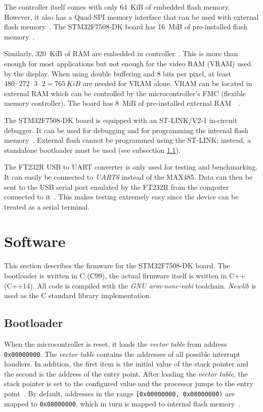 The controller itself comes with only \SI{64}{KiB} of embedded flash memory. However, it also has a
Quad-SPI memory interface that can be used with external flash memory~\cite{mcu-datasheet}. The
STM32F7508-DK board has \SI{16}{MiB} of pre-installed flash memory~\cite{board-user-manual}.

Similarly, \SI{320}{KiB} of RAM are embedded in controller~\cite{mcu-datasheet}. This is more than
enough for most applications but not enough for the video RAM (VRAM) used by the display. When using
double buffering and 8 bits per pixel, at least $480 \cdot 272 \cdot 3 \cdot 2 = 765\,\si{KiB}$ are
needed for VRAM alone. VRAM can be located in external RAM which can be controlled by the microcontroller's
FMC (flexible memory controller). The board has \SI{8}{MiB} of pre-installed external RAM~\
\cite{mcu-datasheet}\cite{board-user-manual}.

The STM32F7508-DK board is equipped with an ST-LINK/V2-1 in-circuit debugger. It can be used for
debugging and for programming the internal flash memory~\cite{board-user-manual}. External flash
cannot be programmed using the ST-LINK; instead, a standalone bootloader must be used (see subsection
\ref{implementation/software/bootloader}).

The FT232R USB to UART converter is only used for testing and benchmarking. It can easily be connected
to \textit{UART6} instead of the MAX485. Data can then be sent to the USB serial port emulated by
the FT232R from the computer connected to it~\cite{ftdi-232r-datasheet}. This makes testing extremely
easy since the device can be treated as a serial terminal.

\section{Software}
\label{implementation/software}

This section describes the firmware for the STM32F7508-DK board. The bootloader is written in C
(C99), the actual firmware itself is written in C++ (C++14). All code is compiled with the
\textit{GNU arm-none-eabi} toolchain. \textit{Newlib} is used as the C standard library implementation.

\subsection{Bootloader}
\label{implementation/software/bootloader}

When the microcontroller is reset, it loads the \textit{vector table} from address \mbox{\lstinline{0x00000000}.}
The \textit{vector table} contains the addresses of all possible interrupt handlers. In addition, the
first item is the initial value of the stack pointer and the second is the address of the entry point.
After loading the \textit{vector table}, the stack pointer is set to the configured value and the
processor jumps to the entry point~\cite{mcu-ref-manual}. By default, addresses in the range
\lstinline{[0x00000000, 0x08000000)} are mapped to \lstinline{0x08000000}, which in turn is mapped
to internal flash memory~\cite{mcu-ref-manual}.

